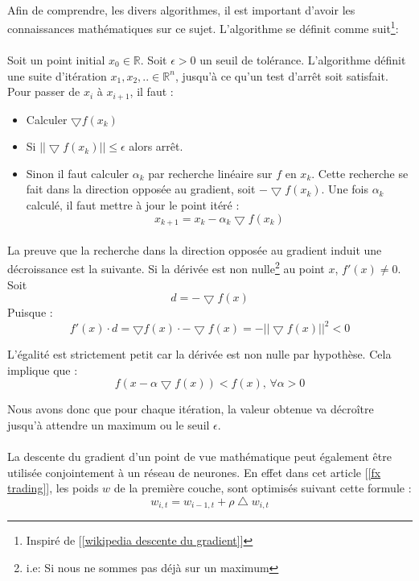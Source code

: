 \documentclass[a4paper, 11pt]{article}
\begin{document}
\paragraph{}
Afin de comprendre, les divers algorithmes, il est important d'avoir les connaissances mathématiques sur ce sujet. L'algorithme se définit comme suit\footnote{Inspiré de [\ref{wikipedia descente du gradient}]}:

\paragraph{}
Soit un point initial $x_0 \in \mathbb{R}$. Soit $\epsilon > 0$ un seuil de tolérance. L'algorithme définit une suite d'itération $x_1,x_2,.. \in \mathbb{R}^n$, jusqu'à ce qu'un test d'arrêt soit satisfait. Pour passer de $x_i$ à $x_{i+1}$, il faut :
\begin{itemize}
\item Calculer $\bigtriangledown f(x_k)$
\item Si $||\bigtriangledown f(x_k)|| \le \epsilon$ alors arrêt.
\item Sinon il faut calculer $\alpha_k$ par recherche linéaire sur $f$ en $x_k$. Cette recherche se fait dans la direction opposée au gradient, soit $-\bigtriangledown f(x_k)$. Une fois $\alpha_k$ calculé, il faut mettre à jour le point itéré : $$x_{k+1} = x_k - \alpha_k \bigtriangledown f(x_k)$$
\end{itemize}

\paragraph{}
La preuve que la recherche dans la direction opposée au gradient induit une décroissance est la suivante.
Si la dérivée est non nulle\footnote{i.e: Si nous ne sommes pas déjà sur un maximum} au point $x$, $f'(x) \ne 0$. Soit
$$d = - \bigtriangledown f(x)$$
Puisque :
$$f'(x) \cdot d = \bigtriangledown f(x) \cdot -\bigtriangledown f(x) = - ||\bigtriangledown f(x) ||^2 < 0$$

L'égalité est strictement petit car la dérivée est non nulle par hypothèse. Cela implique que :
$$f(x -\alpha \bigtriangledown f(x)) < f(x)\text{,\ } \forall \alpha > 0$$

Nous avons donc que pour chaque itération, la valeur obtenue va décroître jusqu'à attendre un maximum ou le seuil $\epsilon$.

\paragraph{}
La descente du gradient d'un point de vue mathématique peut également être utilisée conjointement à un réseau de neurones. En effet dans cet article [\ref{fx trading}], les poids $w$ de la première couche, sont optimisés suivant cette formule :
$$w_{i,t} = w_{i-1,t} + \rho \bigtriangleup w_{i,t}$$
\end{document}
